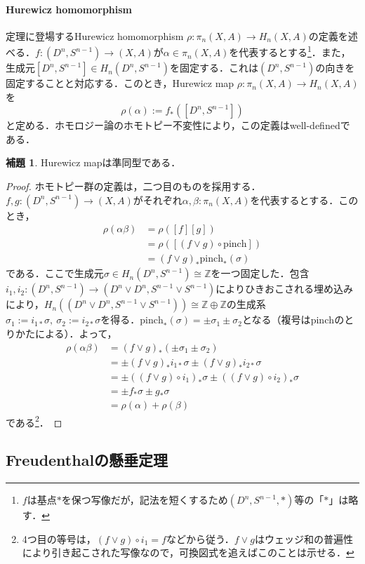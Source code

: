 \documentclass[a4paper,11pt]{jsarticle}
\theoremstyle{definition}
\newtheorem{lem}[thm]{補題}
\begin{document}
\paragraph{Hurewicz homomorphism}定理に登場するHurewicz homomorphism $\rho\colon\pi_n(X,A)\to H_n(X,A)$の定義を述べる．$f\colon (D^n,S^{n-1})\to(X,A)$が$\alpha\in\pi_n(X,A)$を代表するとする\footnote{$f$は基点$*$を保つ写像だが，記法を短くするため$(D^n,S^{n-1},*)$等の「$*$」は略す．}．また，生成元$[D^n,S^{n-1}]\in H_n(D^n,S^{n-1})$を固定する．これは$(D^n,S^{n-1})$の向きを固定することと対応する．このとき，Hurewicz map $\rho\colon\pi_n(X,A)\to H_n(X,A)$を\[
  \rho(\alpha):=f_*([D^n,S^{n-1}])
\]と定める．ホモロジー論のホモトピー不変性により，この定義はwell-definedである．
\begin{lem}
  Hurewicz mapは準同型である．
\end{lem}
\begin{proof}
  ホモトピー群の定義は，二つ目のものを採用する．$f,g\colon (D^n,S^{n-1})\to (X,A)$がそれぞれ$\alpha,\beta\colon\pi_n(X,A)$を代表するとする．このとき，\begin{align*}
    \rho(\alpha\beta)&=\rho([f][g])\\
    &=\rho([(f\vee g)\circ \mathrm{pinch}])\\
    &=(f\vee g)_*\mathrm{pinch}_*(\sigma)
  \end{align*}
  である．ここで生成元$\sigma\in H_n(D^n,S^{n-1})\cong \mathbb{Z}$を一つ固定した．包含$i_1,i_2\colon (D^n,S^{n-1})\to (D^n\vee D^n,S^{n-1}\vee S^{n-1})$によりひきおこされる埋め込みにより，$H_n((D^n\vee D^n,S^{n-1}\vee S^{n-1}))\cong \mathbb{Z}\oplus \mathbb{Z}$の生成系$\sigma_1:=i_{1*}\sigma,\ \sigma_{2}:=i_{2*}\sigma$を得る．$\mathrm{pinch}_*(\sigma)=\pm\sigma_1\pm\sigma_2$となる（複号は$\mathrm{pinch}$のとりかたによる）．よって，\begin{align*}
    \rho(\alpha\beta)&=(f\vee g)_*(\pm\sigma_1\pm\sigma_2)\\
    &=\pm(f\vee g)_*i_{1*}\sigma\pm(f\vee g)_*i_{2*}\sigma\\
    &=\pm((f\vee g)\circ i_1)_*\sigma\pm((f\vee g)\circ i_2)_*\sigma\\
    &=\pm f_*\sigma\pm g_*\sigma\\
    &=\rho(\alpha)+\rho(\beta)
  \end{align*}
  である\footnote{4つ目の等号は，$(f\vee g)\circ i_1=f$などから従う．$f\vee g$はウェッジ和の普遍性により引き起こされた写像なので，可換図式を追えばこのことは示せる．}．
\end{proof}
\subsection{Freudenthalの懸垂定理}
\end{document}
